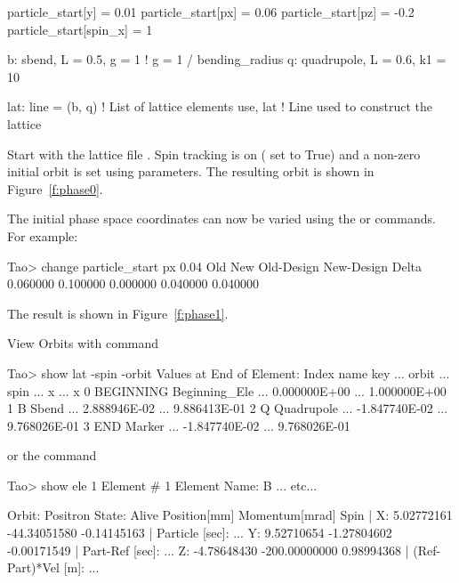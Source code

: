 \documentclass{hitec}     %
\begin{document}
{\begin{code}
particle_start[y] = 0.01
particle_start[px] = 0.06
particle_start[pz] = -0.2
particle_start[spin_x] = 1

b: sbend, L = 0.5, g = 1    ! g = 1 / bending_radius
q: quadrupole, L = 0.6, k1 = 10

lat: line = (b, q)      ! List of lattice elements
use, lat                ! Line used to construct the lattice
\end{code}

Start \tao with the lattice file .
Spin tracking is on ( set to True) and a non-zero initial orbit is set
using  parameters. The resulting orbit is shown in Figure~\ref{f:phase0}.

The initial phase space coordinates can now be varied using the  or 
commands. For example:
\begin{code}
Tao> change particle_start px 0.04
           Old           New    Old-Design    New-Design         Delta
      0.060000      0.100000      0.000000      0.040000      0.040000  
\end{code}

The result is shown in Figure~\ref{f:phase1}. 

View Orbits with  command

\begin{code}
Tao> show lat -spin -orbit
      Values at End of Element:
 Index  name      key           ...           orbit  ...          spin 
                                ...               x  ...             x 
     0  BEGINNING Beginning_Ele ...    0.000000E+00  ...  1.000000E+00 
     1  B         Sbend         ...    2.888946E-02  ...  9.886413E-01 
     2  Q         Quadrupole    ...   -1.847740E-02  ...  9.768026E-01 
     3  END       Marker        ...   -1.847740E-02  ...  9.768026E-01 
\end{code}

or the  command

\begin{code}
Tao> show ele 1
 Element #                1
 Element Name: B
... etc...

Orbit:  Positron   State: Alive
         Position[mm] Momentum[mrad]        Spin   |
  X:       5.02772161   -44.34051580  -0.14145163  | Particle [sec]:     ...
  Y:       9.52710654    -1.27804602  -0.00171549  | Part-Ref [sec]:     ...
  Z:      -4.78648430  -200.00000000   0.98994368  | (Ref-Part)*Vel [m]: ...
\end{code}

}
\end{document}
